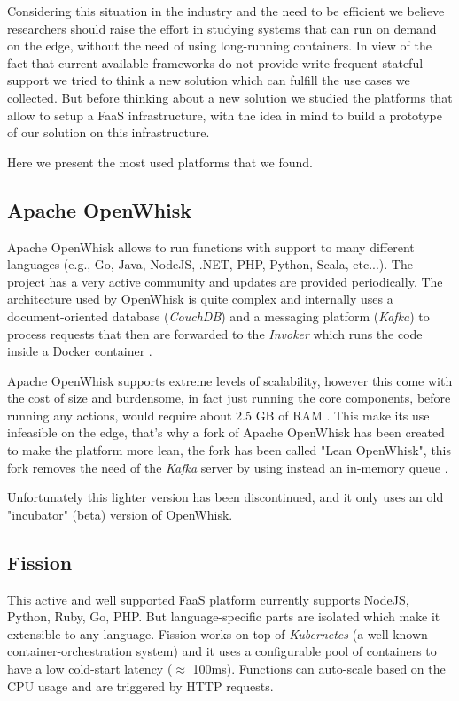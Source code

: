 Considering this situation in the industry and the need to be efficient we believe researchers should raise the effort in studying systems that can run on demand on the edge, without the need of using long-running containers. 
In view of the fact that current available frameworks do not provide write-frequent stateful support we tried to think a new solution which can fulfill the use cases we collected.
But before thinking about a new solution we studied the platforms that allow to setup a FaaS infrastructure, with the idea in mind to build a prototype of our solution on this infrastructure.

Here we present the most used platforms that we found.


\subsection{Apache OpenWhisk}
Apache OpenWhisk allows to run functions with support to many different languages (e.g., Go, Java, NodeJS, .NET, PHP, Python, Scala, etc...). The project has a very active community and updates are provided periodically.
The architecture used by OpenWhisk is quite complex and internally uses a document-oriented database (\textit{CouchDB}) and a messaging platform (\textit{Kafka}) to process requests that then are forwarded to the \textit{Invoker} which runs the code inside a Docker container \cite{openwhisk-architecture}.

Apache OpenWhisk supports extreme levels of scalability, however this come with the cost of size and burdensome, in fact just running the core components, before running any actions, would require about 2.5 GB of RAM \cite{lean-openwhisk}. This make its use infeasible on the edge, that's why a fork of Apache OpenWhisk has been created to make the platform more lean, the fork has been called "Lean OpenWhisk", this fork removes the need of the \textit{Kafka} server by using instead an in-memory queue \cite{lean-openwhisk}. 

Unfortunately this lighter version has been discontinued, and it only uses an old "incubator" (beta) version of OpenWhisk.


\subsection{Fission}
This active and well supported FaaS platform currently supports NodeJS, Python, Ruby, Go, PHP. But language-specific parts are isolated which make it extensible to any language.
Fission works on top of \textit{Kubernetes} (a well-known container-orchestration system) and it uses a configurable pool of containers to have a low cold-start latency ($\approx$ 100ms). Functions can auto-scale based on the CPU usage and are triggered by HTTP requests.

